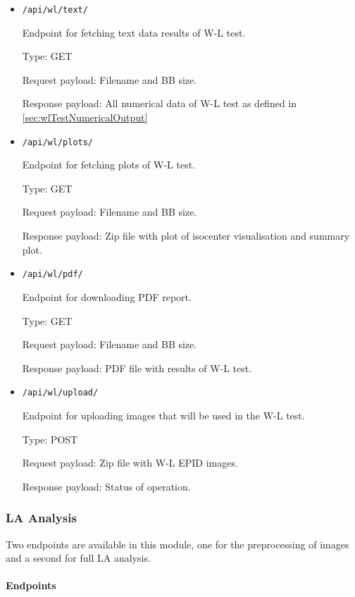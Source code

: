 \begin{itemize}
    \item \verb|/api/wl/text/|

    Endpoint for fetching text data results of W-L test.

    Type: GET
    
    Request payload: Filename and BB size.
    
    Response payload: All numerical data of W-L test as defined in \autoref{sec:wlTestNumericalOutput}
    
    \item \verb|/api/wl/plots/|
    
    Endpoint for fetching plots of W-L test.

    Type: GET
    
    Request payload: Filename and BB size.
    
    Response payload: Zip file with plot of isocenter visualisation and summary plot.
    
    \item \verb|/api/wl/pdf/|

    Endpoint for downloading PDF report.

    Type: GET
    
    Request payload: Filename and BB size.
    
    Response payload: PDF file with results of W-L test.
    
    \item \verb|/api/wl/upload/|

    Endpoint for uploading images that will be used in the W-L test.

    Type: POST
    
    Request payload: Zip file with W-L EPID images. 
    
    Response payload: Status of operation.
    
\end{itemize}

\subsubsection{LA Analysis}

Two endpoints are available in this module, one for the preprocessing of images and a second for full LA analysis.

\paragraph{Endpoints}

